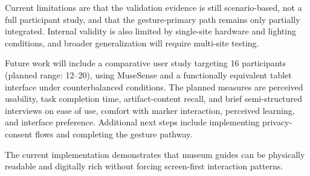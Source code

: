 \documentclass[conference]{IEEEtran}
\begin{document}
Current limitations are that the validation evidence is still scenario-based, not a full participant study, and that the gesture-primary path remains only partially integrated. Internal validity is also limited by single-site hardware and lighting conditions, and broader generalization will require multi-site testing.

Future work will include a comparative user study targeting 16 participants (planned range: 12--20), using MuseSense and a functionally equivalent tablet interface under counterbalanced conditions. The planned measures are perceived usability, task completion time, artifact-content recall, and brief semi-structured interviews on ease of use, comfort with marker interaction, perceived learning, and interface preference. Additional next steps include implementing privacy-consent flows and completing the gesture pathway.

The current implementation demonstrates that museum guides can be physically readable and digitally rich without forcing screen-first interaction patterns.



\end{document}
